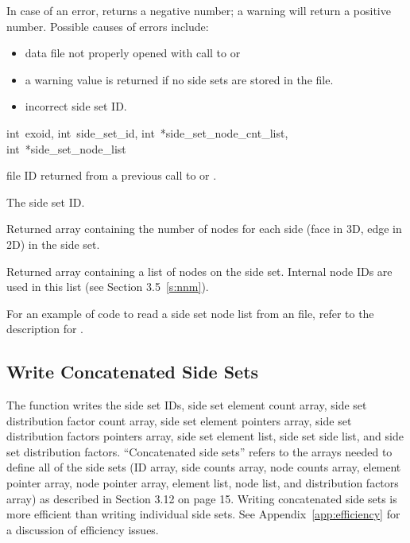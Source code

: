 In case of an error,  returns a
negative number; a warning will return a positive number.  Possible
causes of errors include:

\begin{itemize}
 \item data file not properly opened with call to 
 or 

 \item a warning value is returned if no side sets are stored in the
 file.

 \item incorrect side set ID.
\end{itemize}


{int~exoid,
int~side_set_id,
int~*side_set_node_cnt_list,
int~*side_set_node_list}

\begin{parameters}
\item[{int exoid \R{}}]
\exo{} file ID returned from a previous call to 
or .

\item[{int side_set_id \R{}}]
The side set ID.

\item[{int* side_set_node_cnt_list \W{}}]
Returned array containing the number of nodes for each side (face in
3D, edge in 2D) in the side set.

\item[{int* side_set_node_list \W{}}]
Returned array containing a list of nodes on the side set. Internal
node IDs are used in this list (see Section 3.5~\ref{s:nnm}).
\end{parameters}

For an example of code to read a side set node list from an \exo{}
file, refer to the description for .




\subsection{Write Concatenated Side Sets}

The function  writes the side set
IDs, side set element count array, side set distribution factor count
array, side set element pointers array, side set distribution factors
pointers array, side set element list, side set side list, and side
set distribution factors. ``Concatenated side sets'' refers to the
arrays needed to define all of the side sets (ID array, side counts
array, node counts array, element pointer array, node pointer array,
element list, node list, and distribution factors array) as described
in Section 3.12 on page 15. Writing concatenated side sets is more
efficient than writing individual side sets. See
Appendix~\ref{app:efficiency} for a discussion of efficiency issues.

